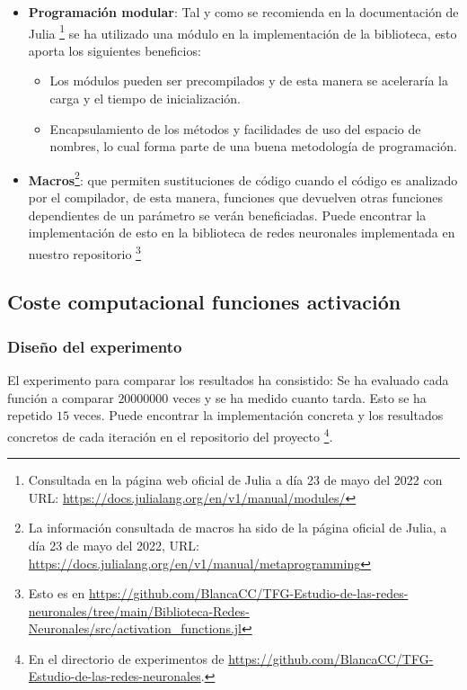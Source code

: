 \begin{itemize}
    \item \textbf{Programación modular}: Tal y como se recomienda en la documentación de Julia \footnote{
        Consultada en la página web oficial de Julia  a día 23 de mayo del 2022 con URL: \url{https://docs.julialang.org/en/v1/manual/modules/}
    } se ha utilizado una módulo en la implementación de la biblioteca, esto aporta los siguientes beneficios: 
    \begin{itemize}
        \item Los módulos pueden ser precompilados y de esta manera se aceleraría la carga y el tiempo de inicialización. 
        \item Encapsulamiento de los métodos y facilidades de uso del espacio de nombres, lo cual forma parte
        de una buena metodología de programación. 
    \end{itemize}
    \item \textbf{Macros}\footnote{La información consultada de macros ha sido  de la página oficial de Julia, a día 23 de mayo del 2022, URL:
    \url{https://docs.julialang.org/en/v1/manual/metaprogramming}}:
    que permiten sustituciones de código cuando el código es analizado por el compilador, 
    de esta manera, funciones que devuelven otras funciones dependientes de un parámetro se verán beneficiadas. 
     Puede encontrar la implementación de esto en la biblioteca de redes neuronales implementada en nuestro 
     repositorio \footnote{Esto es en \url{https://github.com/BlancaCC/TFG-Estudio-de-las-redes-neuronales/tree/main/Biblioteca-Redes-Neuronales/src/activation_functions.jl}}
\end{itemize}




\subsection{Coste computacional funciones activación }

\subsubsection{Diseño del experimento}
El experimento para comparar los resultados ha consistido: 
Se ha evaluado cada función a comparar $20000000$ veces y se ha medido cuanto tarda. 
Esto se ha repetido $15$ veces. Puede encontrar la implementación concreta y los resultados concretos de cada iteración en el repositorio del
proyecto \footnote{En el directorio de experimentos 
de \url{https://github.com/BlancaCC/TFG-Estudio-de-las-redes-neuronales}.}.

